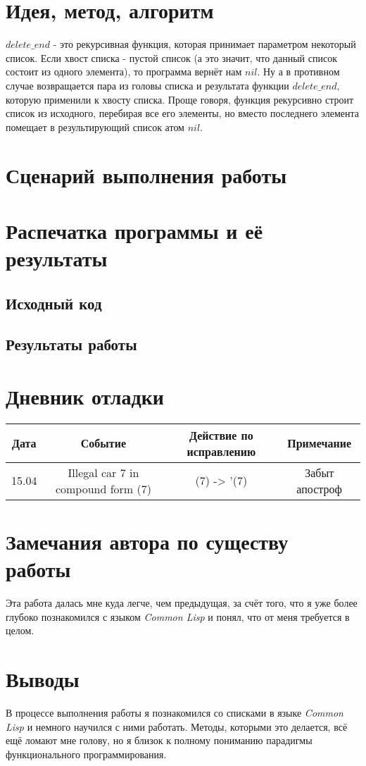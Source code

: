 \documentclass[12pt]{article}
\begin{document}
\section{Идея, метод, алгоритм}

$delete\_end$ - это рекурсивная функция, которая принимает параметром некоторый список. Если хвост списка - пустой список (а это значит, что данный список состоит из одного элемента), то программа вернёт нам $nil$. Ну а в противном случае возвращается пара из головы списка и результата функции $delete\_end$, которую применили к хвосту списка. Проще говоря, функция рекурсивно строит список из исходного, перебирая все его элементы, но вместо последнего элемента помещает в результирующий список атом $nil$.

\section{Сценарий выполнения работы}

\section{Распечатка программы и её результаты}

\subsection{Исходный код}


\subsection{Результаты работы}


\section{Дневник отладки}
\begin{tabular}{|c|c|c|c|}
\hline
Дата & Событие & Действие по исправлению & Примечание \\
\hline
15.04 & Illegal car 7 in compound form (7) & (7) -> '(7) & Забыт апостроф \\ 
\hline
\end{tabular}
\section{Замечания автора по существу работы}
Эта работа далась мне куда легче, чем предыдущая, за счёт того, что я уже более глубоко познакомился с языком {\it Common Lisp} и понял, что от меня требуется в целом.

\section{Выводы}
В процессе выполнения работы я познакомился со списками в языке {\it Common Lisp} и немного научился с ними работать. Методы, которыми это делается, всё ещё ломают мне голову, но я близок к полному пониманию парадигмы функционального программирования.
\end{document}
